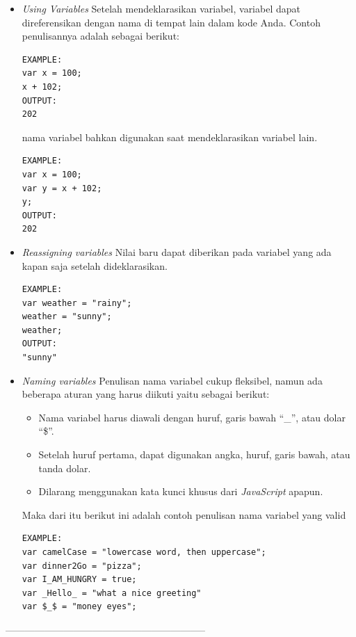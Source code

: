     \begin{itemize}
        \item \textit{Using Variables}\newline
        Setelah mendeklarasikan variabel, variabel dapat direferensikan dengan nama di tempat lain dalam kode Anda. Contoh penulisannya adalah sebagai berikut: 
        \begin{lstlisting}[basicstyle=\ttfamily, frame=single,
    columns=fullflexible, breaklines=true, numbers=none]
EXAMPLE:
var x = 100;
x + 102;
OUTPUT:
202
        \end{lstlisting}
        nama variabel bahkan digunakan saat mendeklarasikan variabel lain.
        \begin{lstlisting}[basicstyle=\ttfamily, frame=single,
    columns=fullflexible, breaklines=true, numbers=none]
EXAMPLE:
var x = 100;
var y = x + 102;
y;
OUTPUT:
202
        \end{lstlisting}
        \item \textit{Reassigning variables}\newline
        Nilai baru dapat diberikan pada variabel yang ada kapan saja setelah dideklarasikan.
        
        \begin{lstlisting}[basicstyle=\ttfamily, frame=single,
        columns=fullflexible, breaklines=true, numbers=none]
EXAMPLE:
var weather = "rainy";
weather = "sunny";
weather;
OUTPUT:
"sunny"
        \end{lstlisting}

        \item \textit{Naming variables}\newline
        Penulisan nama variabel cukup fleksibel, namun ada beberapa aturan yang harus diikuti yaitu sebagai berikut: 
        \begin{itemize}
         \item Nama variabel harus diawali dengan huruf, garis bawah ``\_'', atau dolar ``\$''.
         \item Setelah huruf pertama, dapat digunakan angka, huruf, garis bawah, atau tanda dolar.
         \item Dilarang menggunakan kata kunci khusus dari \textit{JavaScript} apapun.
        \end{itemize}
        Maka dari itu berikut ini adalah contoh penulisan nama variabel yang valid 
         \begin{lstlisting}[basicstyle=\ttfamily, frame=single,
            columns=fullflexible, breaklines=true, numbers=none]
EXAMPLE:
var camelCase = "lowercase word, then uppercase";
var dinner2Go = "pizza";
var I_AM_HUNGRY = true;
var _Hello_ = "what a nice greeting"
var $_$ = "money eyes";
        \end{lstlisting}
    \end{itemize}
        --------------------------------------------------------------

